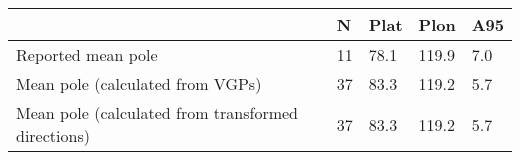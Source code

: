 \begin{tabular}{lllll}
\toprule
{} &   N &  Plat &   Plon &  A95 \\
\midrule
Reported mean pole                                 &  11 &  78.1 &  119.9 &  7.0 \\
Mean pole (calculated from VGPs)                   &  37 &  83.3 &  119.2 &  5.7 \\
Mean pole (calculated from transformed directions) &  37 &  83.3 &  119.2 &  5.7 \\
\bottomrule
\end{tabular}
